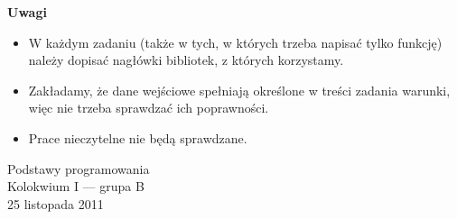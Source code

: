 \documentclass[12pt]{article}
\begin{document}
\vfill

\textbf{Uwagi}
\begin{itemize}
 \item W każdym zadaniu (także w tych, w których trzeba napisać tylko funkcję) należy dopisać nagłówki bibliotek, z których korzystamy.
 \item Zakładamy, że dane wejściowe spełniają określone w treści zadania warunki, więc nie trzeba sprawdzać ich poprawności.
 \item Prace nieczytelne nie będą sprawdzane.
\end{itemize}

\newpage

\begin{center}
\Large{Podstawy programowania}\\
\large{Kolokwium I --- grupa B}\\
{25 listopada 2011}
\end{center}
\end{document}
